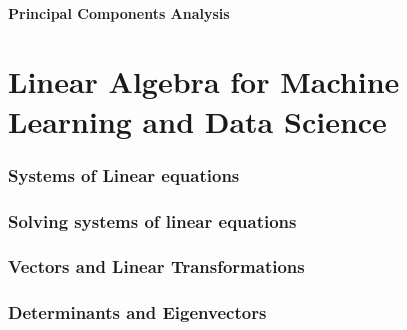 \subsection{Principal Components Analysis}


\part{Linear Algebra for Machine Learning and Data Science}


\section{Systems of Linear equations}


\section{Solving systems of linear equations}


\section{Vectors and Linear Transformations}


\section{Determinants and Eigenvectors}